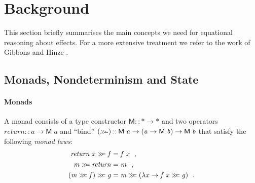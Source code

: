 \documentclass{llncs}
\newcommand{\Conid}[1]{\mathit{#1}}
\newcommand{\Varid}[1]{\mathit{#1}}
\let\Varid\mathit
\let\Conid\mathsf
\begin{document}
\section{Background}
\label{sec:background}
This section briefly summarises the main concepts we need for equational
reasoning about effects.
For a more extensive treatment we refer to the work of Gibbons and Hinze
\cite{GibbonsHinze:11:Just}.

\subsection{Monads, Nondeterminism and State}
\paragraph{Monads}
A monad consists of a type constructor \ensuremath{\Conid{M}\mathbin{::}\mathbin{*}\to \mathbin{*}} and two operators \ensuremath{\Varid{return}\mathbin{::}\Varid{a}\to \Conid{M}\;\Varid{a}} and ``bind'' \ensuremath{(\mathrel{\hstretch{0.7}{>\!\!>\!\!=}})\mathbin{::}\Conid{M}\;\Varid{a}\to (\Varid{a}\to \Conid{M}\;\Varid{b})\to \Conid{M}\;\Varid{b}} that satisfy the following {\em monad laws}:
\begin{align}
  \ensuremath{\Varid{return}\;\Varid{x}\mathrel{\hstretch{0.7}{>\!\!>\!\!=}}\Varid{f}} &= \ensuremath{\Varid{f}\;\Varid{x}}\mbox{~~,} \label{eq:monad-bind-ret}\\
  \ensuremath{\Varid{m}\mathrel{\hstretch{0.7}{>\!\!>\!\!=}}\Varid{return}} &= \ensuremath{\Varid{m}} \mbox{~~,} \label{eq:monad-ret-bind}\\
  \ensuremath{(\Varid{m}\mathrel{\hstretch{0.7}{>\!\!>\!\!=}}\Varid{f})\mathrel{\hstretch{0.7}{>\!\!>\!\!=}}\Varid{g}} &= \ensuremath{\Varid{m}\mathrel{\hstretch{0.7}{>\!\!>\!\!=}}(\lambda \Varid{x}\to \Varid{f}\;\Varid{x}\mathrel{\hstretch{0.7}{>\!\!>\!\!=}}\Varid{g})} \mbox{~~.}
    \label{eq:monad-assoc}
\end{align}
\end{document}
